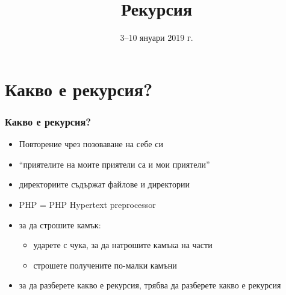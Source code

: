 \documentclass[alsotrans]{beamerswitch}
\title{Рекурсия}
\date{3--10 януари 2019 г.}
\begin{document}
\begin{frame}
  \titlepage
\end{frame}

\section{Какво е рекурсия?}

\begin{frame}
  \frametitle{Какво е рекурсия?}

  \begin{center}
  \end{center}
  \begin{itemize}[<+(2)->]
  \item Повторение чрез позоваване на себе си
  \item ``приятелите на моите приятели са и мои приятели''
  \item директориите съдържат файлове и директории
  \item PHP = PHP Hypertext preprocessor
  \item за да строшите камък:
    \begin{itemize}
    \item ударете с чука, за да натрошите камъка на части
    \item строшете получените по-малки камъни
    \end{itemize}
  \item за да разберете какво е рекурсия, трябва да разберете какво е рекурсия
  \end{itemize}
\end{frame}
\end{document}
